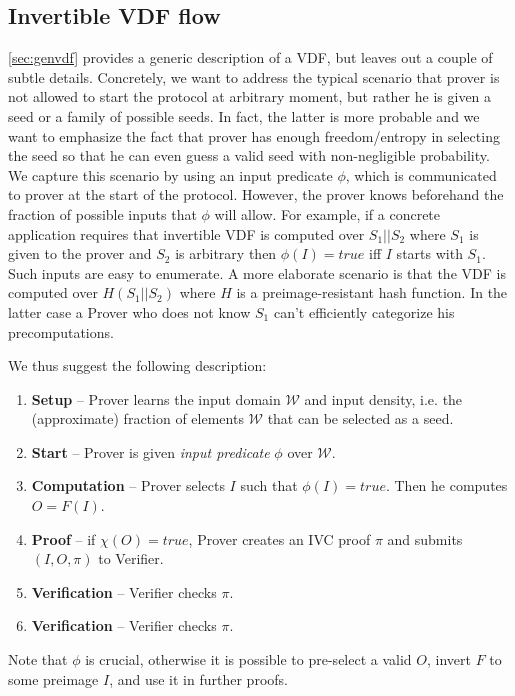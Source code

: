 \documentclass{article}
\begin{document}
\subsection{Invertible VDF flow}

\cref{sec:genvdf} provides a generic description of a VDF, but leaves out a couple of subtle details. Concretely, we want to address the typical scenario that prover is not allowed to start the protocol at arbitrary moment, but rather he is given a seed or a family of possible seeds. In fact, the latter is more probable and we want to emphasize the fact that prover has enough freedom/entropy in selecting the seed so that he can even guess a valid seed with non-negligible probability. We capture this scenario by using an input predicate $\phi$, which is communicated to prover at the start of the protocol. However, the prover knows beforehand the fraction of possible inputs that $\phi $ will allow. For example, if a concrete application requires that invertible VDF is computed over $S_1||S_2$ where $S_1$ is given to the prover and $S_2$ is arbitrary then $\phi(I)=true$ iff $I$ starts with $S_1$. Such inputs are easy to enumerate. A more elaborate scenario is that the VDF is computed over $H(S_1||S_2)$ where $H$ is a preimage-resistant hash function.  In the latter case a Prover who does not know $S_1$ can't efficiently categorize his precomputations.


We thus suggest the following description:
\begin{enumerate}
    \item \textbf{Setup} -- Prover learns the input domain $\mathcal{W}$ and input density, i.e. the (approximate) fraction of elements $\mathcal{W}$ that can be selected as a seed.
    \item \textbf{Start} -- Prover is given \emph{ input predicate} $\phi$  over $\mathcal{W}$. 
    \item \textbf{Computation} -- Prover selects   $I$ such that $\phi(I)=true$. Then he computes $O=F(I)$.
    \item \textbf{Proof} -- if $\chi(O)=true$, Prover creates an IVC proof $\pi$ and submits $(I,O,\pi)$ to Verifier.
    \item \textbf{Verification} -- Verifier checks $\pi$.
    \item \textbf{Verification} -- Verifier checks $\pi$.
\end{enumerate} 
Note that $\phi$ is crucial, otherwise it is possible to pre-select a valid $O$, invert $F$ to some preimage $I$, and use it in further proofs.
\end{document}
